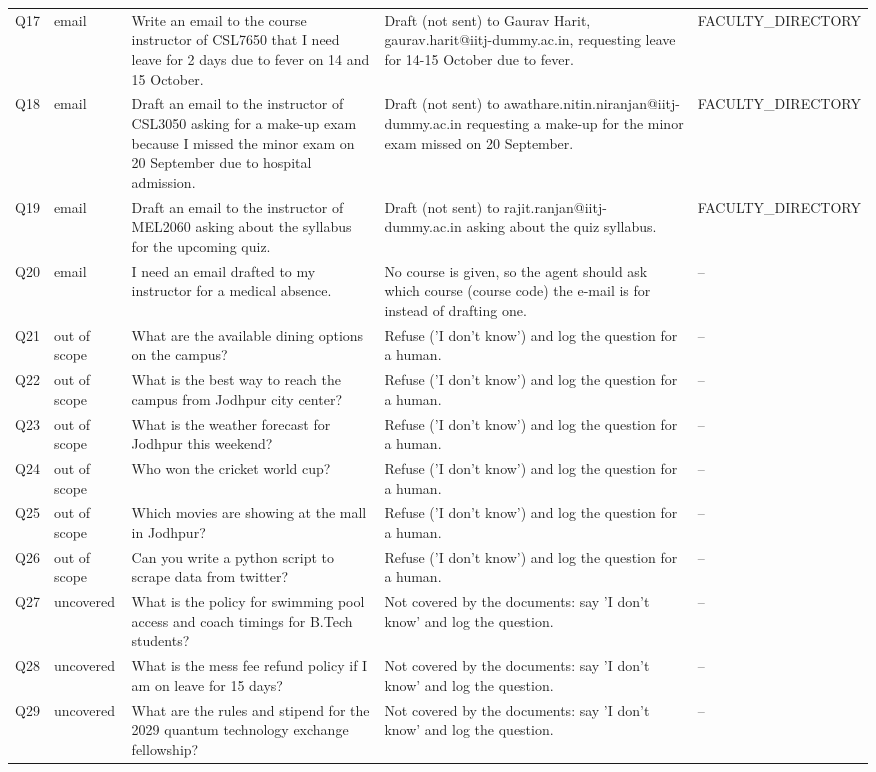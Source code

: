 \begin{small}
\begin{longtable}{>{\raggedright\arraybackslash}p{0.6cm}>{\raggedright\arraybackslash}p{1.4cm}>{\raggedright\arraybackslash}p{4.3cm}>{\raggedright\arraybackslash}p{5.6cm}>{\raggedright\arraybackslash}p{2.3cm}}
Q17 & email & Write an email to the course instructor of CSL7650 that I need leave for 2 days due to fever on 14 and 15 October. & Draft (not sent) to Gaurav Harit, gaurav.harit@iitj-dummy.ac.in, requesting leave for 14-15 October due to fever. & FACULTY\_\allowbreak{}DIRECTORY \\
Q18 & email & Draft an email to the instructor of CSL3050 asking for a make-up exam because I missed the minor exam on 20 September due to hospital admission. & Draft (not sent) to awathare.nitin.niranjan@iitj-dummy.ac.in requesting a make-up for the minor exam missed on 20 September. & FACULTY\_\allowbreak{}DIRECTORY \\
Q19 & email & Draft an email to the instructor of MEL2060 asking about the syllabus for the upcoming quiz. & Draft (not sent) to rajit.ranjan@iitj-dummy.ac.in asking about the quiz syllabus. & FACULTY\_\allowbreak{}DIRECTORY \\
Q20 & email & I need an email drafted to my instructor for a medical absence. & No course is given, so the agent should ask which course (course code) the e-mail is for instead of drafting one. & -- \\
Q21 & out of scope & What are the available dining options on the campus? & Refuse ('I don't know') and log the question for a human. & -- \\
Q22 & out of scope & What is the best way to reach the campus from Jodhpur city center? & Refuse ('I don't know') and log the question for a human. & -- \\
Q23 & out of scope & What is the weather forecast for Jodhpur this weekend? & Refuse ('I don't know') and log the question for a human. & -- \\
Q24 & out of scope & Who won the cricket world cup? & Refuse ('I don't know') and log the question for a human. & -- \\
Q25 & out of scope & Which movies are showing at the mall in Jodhpur? & Refuse ('I don't know') and log the question for a human. & -- \\
Q26 & out of scope & Can you write a python script to scrape data from twitter? & Refuse ('I don't know') and log the question for a human. & -- \\
Q27 & uncovered & What is the policy for swimming pool access and coach timings for B.Tech students? & Not covered by the documents: say 'I don't know' and log the question. & -- \\
Q28 & uncovered & What is the mess fee refund policy if I am on leave for 15 days? & Not covered by the documents: say 'I don't know' and log the question. & -- \\
Q29 & uncovered & What are the rules and stipend for the 2029 quantum technology exchange fellowship? & Not covered by the documents: say 'I don't know' and log the question. & -- \\
\bottomrule
\end{longtable}
\end{small}
